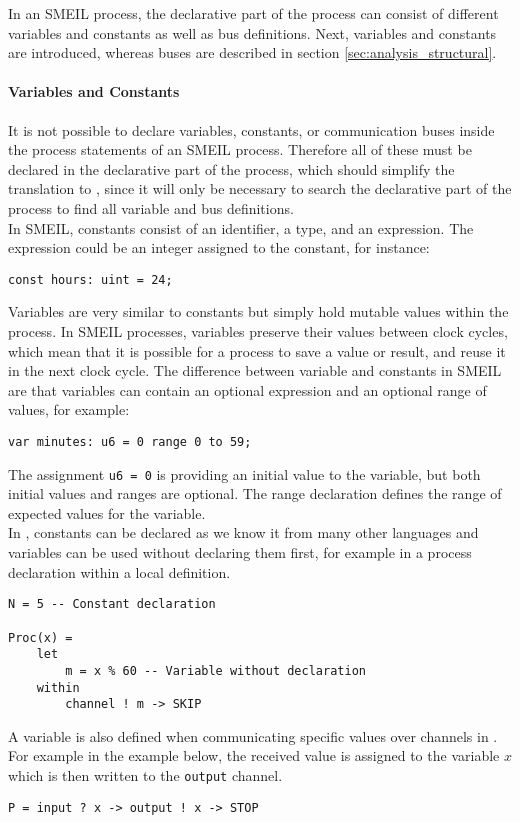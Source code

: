 In an SMEIL process, the declarative part of the process can consist of different variables and constants as well as bus definitions. Next, variables and constants are introduced, whereas buses are described in section \ref{sec:analysis_structural}.
\paragraph{Variables and Constants}
It is not possible to declare variables, constants, or communication buses inside the process statements of an SMEIL process. Therefore all of these must be declared in the declarative part of the process, which should simplify the translation to \cspm{}, since it will only be necessary to search the declarative part of the process to find all variable and bus definitions.\\

In SMEIL, constants consist of an identifier, a type, and an expression. The expression could be an integer assigned to the constant, for instance:
\begin{verbatim}
const hours: uint = 24;
\end{verbatim}
Variables are very similar to constants but simply hold mutable values within the process. In SMEIL processes, variables preserve their values between clock cycles, which mean that it is possible for a process to save a value or result, and reuse it in the next clock cycle. The difference between variable and constants in SMEIL are that variables can contain an optional expression and an optional range of values, for example:
\begin{verbatim}
var minutes: u6 = 0 range 0 to 59;
\end{verbatim}
The assignment \texttt{u6 = 0} is providing an initial value to the variable, but both initial values and ranges are optional. The range declaration defines the range of expected values for the variable. \\

In \cspm, constants can be declared as we know it from many other languages and variables can be used without declaring them first, for example in a process declaration within a local definition.
\begin{verbatim}
N = 5 -- Constant declaration

Proc(x) =
    let
        m = x % 60 -- Variable without declaration
    within
        channel ! m -> SKIP
\end{verbatim}
A variable is also defined when communicating specific values over channels in \cspm. For example in the example below, the received value is assigned to the variable $x$ which is then written to the \texttt{output} channel.
\begin{verbatim}
P = input ? x -> output ! x -> STOP
\end{verbatim}

